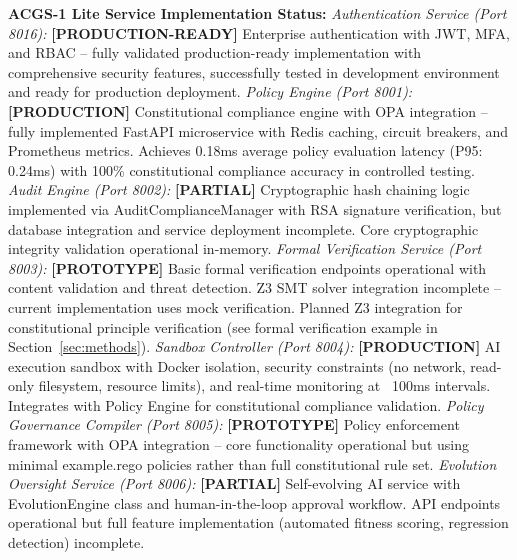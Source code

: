 \documentclass[manuscript,screen,9pt]{acmart}
\begin{document}
\textbf{ACGS-1 Lite Service Implementation Status:}
\textit{Authentication Service (Port 8016):} \textbf{[PRODUCTION-READY]} Enterprise authentication with JWT, MFA, and RBAC -- fully validated production-ready implementation with comprehensive security features, successfully tested in development environment and ready for production deployment.
\textit{Policy Engine (Port 8001):} \textbf{[PRODUCTION]} Constitutional compliance engine with OPA integration -- fully implemented FastAPI microservice with Redis caching, circuit breakers, and Prometheus metrics. Achieves 0.18ms average policy evaluation latency (P95: 0.24ms) with 100\% constitutional compliance accuracy in controlled testing.
\textit{Audit Engine (Port 8002):} \textbf{[PARTIAL]} Cryptographic hash chaining logic implemented via AuditComplianceManager with RSA signature verification, but database integration and service deployment incomplete. Core cryptographic integrity validation operational in-memory.
\textit{Formal Verification Service (Port 8003):} \textbf{[PROTOTYPE]} Basic formal verification endpoints operational with content validation and threat detection. Z3 SMT solver integration incomplete -- current implementation uses mock verification. Planned Z3 integration for constitutional principle verification (see formal verification example in Section~\ref{sec:methods}).
\textit{Sandbox Controller (Port 8004):} \textbf{[PRODUCTION]} AI execution sandbox with Docker isolation, security constraints (no network, read-only filesystem, resource limits), and real-time monitoring at ~100ms intervals. Integrates with Policy Engine for constitutional compliance validation.
\textit{Policy Governance Compiler (Port 8005):} \textbf{[PROTOTYPE]} Policy enforcement framework with OPA integration -- core functionality operational but using minimal example.rego policies rather than full constitutional rule set.
\textit{Evolution Oversight Service (Port 8006):} \textbf{[PARTIAL]} Self-evolving AI service with EvolutionEngine class and human-in-the-loop approval workflow. API endpoints operational but full feature implementation (automated fitness scoring, regression detection) incomplete.
\end{document}
